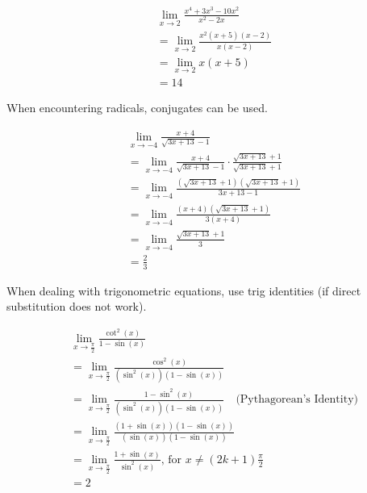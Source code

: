 \documentclass[12pt]{article}
\begin{document}
\begin{align*}
     & \lim_{x \to 2} \frac{x^4 + 3x^3 - 10x^2}{x^2 - 2x}           \\[6pt]
     & = \lim_{x \to 2} \frac{x^2 (x+5)(x-2)}{x(x-2)} \\
     & = \lim_{x \to 2} x(x+5)                                      \\
     & = 14
\end{align*}

\noindent When encountering radicals, conjugates can be used.

\begin{align*}
     & \lim_{x \to -4} \frac{x+4}{\sqrt{3x+13}-1}                                               \\[6pt]
     & = \lim_{x \to -4} \frac{x+4}{\sqrt{3x+13}-1} \cdot \frac{\sqrt{3x+13}+1}{\sqrt{3x+13}+1} \\[6pt]
     & = \lim_{x \to -4} \frac{(\sqrt{3x+13}+1)(\sqrt{3x+13}+1)}{3x+13-1}                       \\[6pt]
     & = \lim_{x \to -4} \frac{(x+4)(\sqrt{3x+13}+1)}{3(x+4)}                                   \\[6pt]
     & = \lim_{x \to -4} \frac{\sqrt{3x+13}+1}{3}                                               \\[6pt]
     & = \frac{2}{3}
\end{align*}

\noindent When dealing with trigonometric equations, use trig identities (if direct substitution does not work).

\begin{align*}
     & \lim_{x \to \frac{\pi}{2}} \frac{\cot^2(x)}{1-\sin(x)}                                                                                \\[6pt]
     & = \lim_{x \to \frac{\pi}{2}} \frac{\cos^2(x)}{\left( \sin^2(x) \right)\left(1-\sin(x)\right)}                                         \\[6pt]
     & = \lim_{x \to \frac{\pi}{2}} \frac{1-\sin^2(x)}{\left( \sin^2(x) \right)\left(1-\sin(x)\right)} \quad \text{(Pythagorean's Identity)} \\[6pt]
     & = \lim_{x \to \frac{\pi}{2}} \frac{\left( 1+\sin(x) \right)\left( 1-\sin(x) \right)}{\left( \sin(x) \right)\left(1-\sin(x)\right)}    \\[6pt]
     & = \lim_{x \to \frac{\pi}{2}} \frac{1+\sin(x)}{\sin^2(x)} \text{, for } x \ne (2k+1)\frac{\pi}{2}                                      \\[6pt]
     & = 2
\end{align*}
\end{document}
